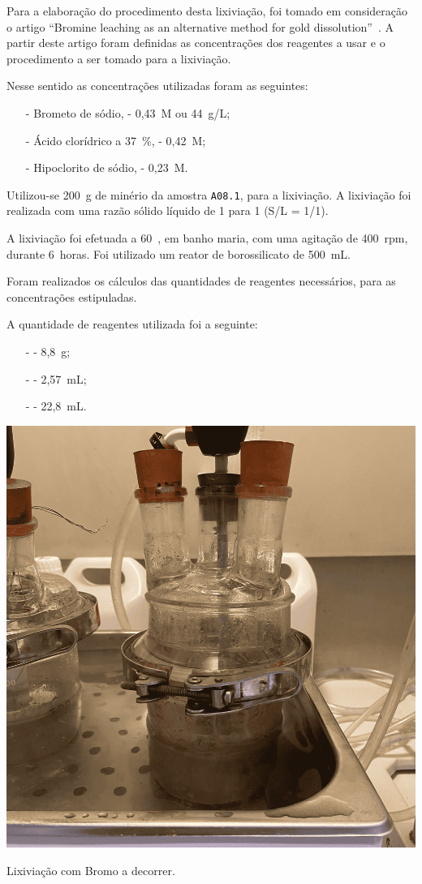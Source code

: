 Para a elaboração do procedimento desta lixiviação, foi tomado em consideração o artigo ``Bromine leaching as an alternative method for gold dissolution''~\cite{bromo_2018}.
A partir deste artigo foram definidas as concentrações dos reagentes a usar e o procedimento a ser tomado para a lixiviação.

Nesse sentido as concentrações utilizadas foram as seguintes:
\begin{itemize}
    \item[-] Brometo de sódio, \bromo{} - 0,43~M ou 44~g/L;
    \item[-] Ácido clorídrico a 37~\%, \acl{} - 0,42~M;
    \item[-] Hipoclorito de sódio, \hipso{} - 0,23~M.  
\end{itemize}

Utilizou-se 200~g de minério da amostra \texttt{A08.1}, para a lixiviação.
A lixiviação foi realizada com uma razão sólido líquido de 1 para 1 (S/L = 1/1).

A lixiviação foi efetuada a 60~\graus{}, em banho maria, com uma agitação de 400~rpm, durante 6~horas.
Foi utilizado um reator de borossilicato de 500~mL.

Foram realizados os cálculos das quantidades de reagentes necessários, para as concentrações estipuladas. 

A quantidade de reagentes utilizada foi a seguinte:
\begin{itemize}
    \item[-] \bromo{} - 8,8~g;
    \item[-] \acl{} - 2,57~mL;
    \item[-] \hipso{} - 22,8~mL.
\end{itemize}

\begin{marginfigure}
    \centering
    \includegraphics[width=0.9\linewidth]{figures/lixiviação bromo.png}
    \caption{Lixiviação com Bromo a decorrer.}
    \label{fig:lixiacao-bromo}
\end{marginfigure}

